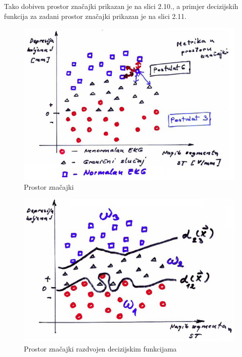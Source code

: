 \documentclass{book}
\begin{document}
Tako dobiven prostor značajki prikazan je na slici 2.10., a primjer decizijskih
funkcija za zadani prostor značajki prikazan je na slici 2.11.

\begin{figure}[H]
 \begin{center}
 \includegraphics[scale=0.5]{./pics/prostorZnacajki}
 \caption{Prostor značajki}
 \end{center}
 \end{figure}

\begin{figure}[H]
 \begin{center}
 \includegraphics[scale=0.5]{./pics/decizijskeFunkcije}
 \caption{Prostor značajki razdvojen decizijskim funkcijama}
 \end{center}
 \end{figure}
 
\end{document}
